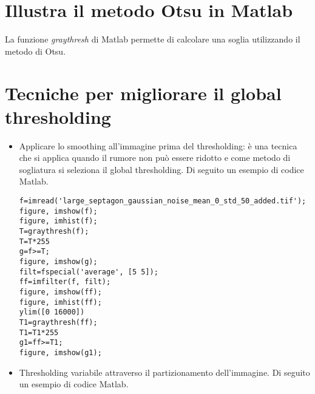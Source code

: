 \section{Illustra il metodo Otsu in Matlab} 
La funzione \textit{graythresh} di Matlab permette di calcolare una soglia utilizzando il metodo di Otsu.

\section{Tecniche per migliorare il global thresholding}
\begin{itemize}
\item Applicare lo smoothing all'immagine prima del thresholding: è una tecnica che si applica quando il rumore non può essere ridotto e come metodo di sogliatura si seleziona il global thresholding. Di seguito un esempio di codice Matlab.

\begin{lstlisting}
f=imread('large_septagon_gaussian_noise_mean_0_std_50_added.tif');
figure, imshow(f);
figure, imhist(f);
T=graythresh(f);
T=T*255
g=f>=T;
figure, imshow(g);
filt=fspecial('average', [5 5]);
ff=imfilter(f, filt);
figure, imshow(ff);
figure, imhist(ff);
ylim([0 16000])
T1=graythresh(ff);
T1=T1*255
g1=ff>=T1;
figure, imshow(g1);
\end{lstlisting}

\item Thresholding variabile attraverso il partizionamento dell'immagine. Di seguito un esempio di codice Matlab.

\begin{lstlisting}


\end{lstlisting}

\end{itemize}